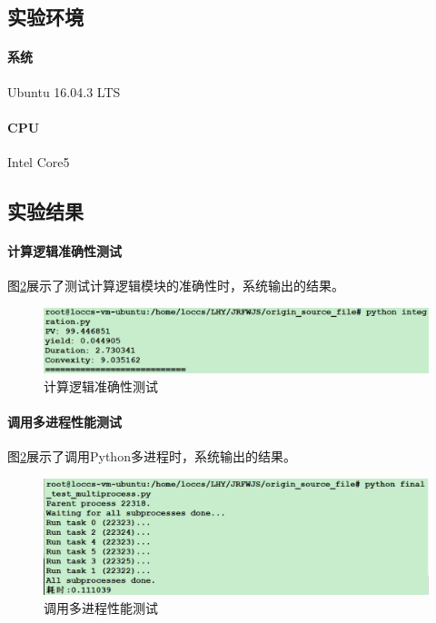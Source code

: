 \subsection{实验环境}
\paragraph{系统} Ubuntu 16.04.3 LTS
\paragraph{CPU} Intel Core5

\subsection{实验结果}
\paragraph{计算逻辑准确性测试}
图\ref{fig:sys.param}展示了测试计算逻辑模块的准确性时，系统输出的结果。
\begin{figure}[H]
\begin{center}
\includegraphics[width=16cm]{img//integration.PNG}
\caption{计算逻辑准确性测试}
\label{fig:sys.param}
\end{center}
\end{figure}


\paragraph{调用多进程性能测试}
图\ref{fig:sys.param}展示了调用Python多进程时，系统输出的结果。
\begin{figure}[H]
\begin{center}
\includegraphics[width=16cm]{img//final_test_multiprocess.PNG}
\caption{调用多进程性能测试}
\label{fig:sys.param}
\end{center}
\end{figure}


